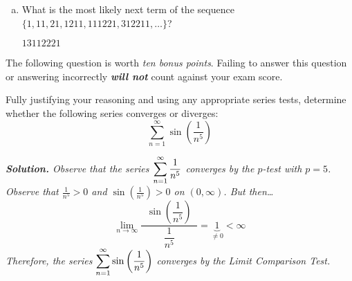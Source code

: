 \documentclass[12pt,letterpaper]{exam}
\begin{document}
\begin{questions}
\begin{enumerate}[(a)]
	\item What is the most likely next term of the sequence $\{ 1, 11, 21, 1211, 111221, 312211, \ldots \}$? \par\vspace{0.5cm} \underline{ \hspace{2cm} $13112221$ \hspace{2cm}}
	\end{enumerate} \par\vspace{0.5cm}
	
 The following question is worth \textit{ten bonus points}. Failing to answer this question or answering incorrectly \textit{\bfseries will not} count against your exam score. \par\vspace{0.3cm} 

Fully justifying your reasoning and using any appropriate series tests, determine whether the following series converges or diverges:	
	\[
	\sum_{n=1}^\infty \sin \left( \dfrac{1}{n^5} \right)
	\] \pspace

{\itshape \textbf{Solution.} Observe that the series $\displaystyle\sum_{n=1}^\infty \dfrac{1}{n^5}$ converges by the $p$-test with $p= 5$. Observe that $\frac{1}{n^5} > 0$ and $\sin(\frac{1}{n^5}) > 0$ on $(0, \infty)$. But then\dots
	\[
	\lim_{n \to \infty} \dfrac{\;\;\sin \left( \dfrac{1}{n^5} \right)\;\;}{\dfrac{1}{n^5}}= \underbrace{1}_{\neq 0} < \infty
	\]
Therefore, the series $\displaystyle\sum_{n=1}^\infty \sin \left( \dfrac{1}{n^5} \right)$ converges by the Limit Comparison Test.}

\end{questions}
\end{document}
